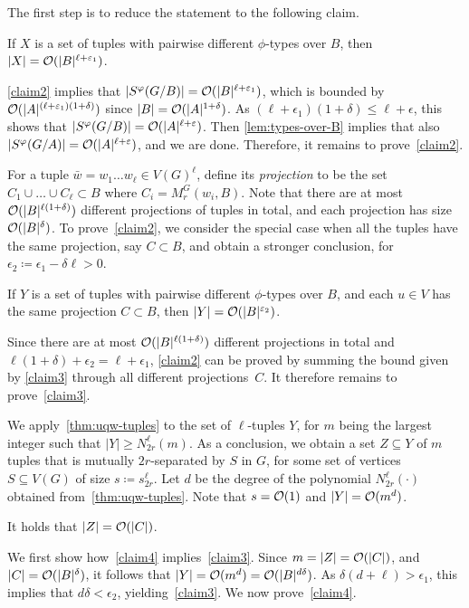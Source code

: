 	\setcounter{claim}{0}
	
The first step is to reduce the statement to the following claim.
\begin{claim}\label{claim2}
If $X$ is a set of tuples with pairwise different $\phi$-types over $B$, then $|X|=\mathcal{O}(|B|^{\ell+\varepsilon_1})$.
\end{claim}	
\cref{claim2} implies that $|S^\varphi(G/B)|=\mathcal{O}(|B|^{\ell+\varepsilon_1})$, 
which is bounded by $\mathcal{O}(|A|^{(\ell+\varepsilon_1)(1+\delta)})$ since $|B|=\mathcal{O}(|A|^{1+\delta})$. As $(\ell+\epsilon_1)(1+\delta)\le \ell+\epsilon$, this shows that $|S^\varphi(G/B)|=\mathcal{O}(|A|^{\ell+\varepsilon})$.
Then \cref{lem:types-over-B} implies that also $|S^\varphi(G/A)|=\mathcal{O}(|A|^{\ell+\varepsilon})$, and we are done. Therefore, it remains to prove~\cref{claim2}.

\medskip

For a tuple $\bar w=w_1\ldots w_\ell\in V(G)^\ell$, define its \emph{projection}
to be the set $C_1\cup\ldots\cup C_\ell\subset B$ where  
$C_i=M^G_r(w_i, B)$. Note that there are at most 
$\mathcal{O}(|B|^{\ell(1+\delta)})$ different projections of tuples in total, and each projection has size $\mathcal{O}(|B|^\delta)$.
To prove~\cref{claim2}, we consider the special case when all the tuples have the same projection, say $C\subset B$, and  obtain a stronger conclusion,
for $\epsilon_2\coloneqq \epsilon_1-\delta\ell>0$.
\begin{claim}\label{claim3}
If $Y$ is a set of tuples with pairwise different $\phi$-types over $B$, and each $u\in V$ has the same projection $C\subset B$, then $|Y|=\mathcal{O}(|B|^{\varepsilon_2})$.
\end{claim}
Since there are at most $\mathcal{O}(|B|^{\ell(1+\delta)})$ different projections in total and $\ell(1+\delta)+\epsilon_2=\ell+\epsilon_1$, \cref{claim2} can be proved
by summing the bound given by \cref{claim3} through all different projections~$C$.
It therefore remains to prove~\cref{claim3}.

\medskip

We apply~\cref{thm:uqw-tuples} to the set of $\ell$-tuples $Y$, for $m$ being the largest integer such that $|Y|\ge N^{\ell}_{2r}(m)$.
  As a conclusion, we obtain a set $Z\subseteq Y$ of $m$ tuples that is mutually $2r$-separated by $S$ in $G$, for some set of vertices $S\subseteq V(G)$ of size $s\coloneqq s^{\ell}_{2r}$.
  Let $d$ be the degree of the polynomial $N^\ell_{2r}(\cdot)$ obtained from~\cref{thm:uqw-tuples}.
  Note that $s=\mathcal{O}(1)$ and $|Y|=\mathcal{O}(m^d)$.
  
  
  \begin{claim}\label{claim4}
It holds that $|Z|=\mathcal{O}(|C|)$.
  \end{claim}
  We first show how~\cref{claim4} implies~\cref{claim3}.
  Since $m=|Z|=\mathcal{O}(|C|)$,
  and $|C|=\mathcal{O}(|B|^\delta)$,
  it follows that $|Y|=\mathcal{O}(m^d)=\mathcal{O}(|B|^{d\delta})$. As $\delta(d+\ell)>\epsilon_1$, this implies that $d\delta<\epsilon_2$, yielding~\cref{claim3}.
  We now prove~\cref{claim4}.

